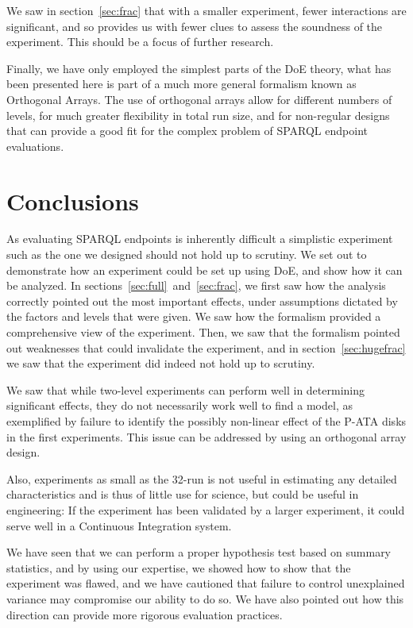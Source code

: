 \documentclass{llncs}
\begin{document}
We saw in section~\ref{sec:frac} that with a smaller experiment, fewer
interactions are significant, and so provides us with fewer clues to
assess the soundness of the experiment. This should be a focus of
further research.


Finally, we have only employed the simplest parts of the DoE theory,
what has been presented here is part of a much more general formalism
known as Orthogonal Arrays. The use of orthogonal arrays allow for
different numbers of levels, for much greater flexibility in total run
size, and for non-regular designs that can provide a good fit for the
complex problem of SPARQL endpoint evaluations.

\section{Conclusions}

As evaluating SPARQL endpoints is inherently difficult a simplistic
experiment such as the one we designed should not hold up to
scrutiny. We set out to demonstrate how an experiment could be set up
using DoE, and show how it can be analyzed. In
sections~\ref{sec:full}~and~\ref{sec:frac}, we first saw how the
analysis correctly pointed out the most important effects, under
assumptions dictated by the factors and levels that were given. We saw
how the formalism provided a comprehensive view of the
experiment. Then, we saw that the formalism pointed out weaknesses
that could invalidate the experiment, and in
section~\ref{sec:hugefrac} we saw that the experiment did indeed not
hold up to scrutiny.

We saw that while two-level experiments can perform well in determining
significant effects, they do not necessarily work well to find a
model, as exemplified by failure to identify the possibly non-linear
effect of the P-ATA disks in the first experiments. This issue can be
addressed by using an orthogonal array design.

Also, experiments as small as the 32-run is not useful in estimating
any detailed characteristics and is thus of little use for science,
but could be useful in engineering: If the experiment has been
validated by a larger experiment, it could serve well in a Continuous
Integration system.

We have seen that we can perform a proper hypothesis test based on
summary statistics, and by using our expertise, we showed how to show
that the experiment was flawed, and we have cautioned that failure to
control unexplained variance may compromise our ability to do so. We
have also pointed out how this direction can provide more rigorous
evaluation practices.
\end{document}
